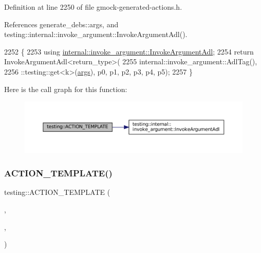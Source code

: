 Definition at line 2250 of file gmock-\/generated-\/actions.\+h.



References generate\+\_\+debs\+::args, and testing\+::internal\+::invoke\+\_\+argument\+::\+Invoke\+Argument\+Adl().


\begin{DoxyCode}
2252                                                             \{
2253   \textcolor{keyword}{using} \hyperlink{namespacetesting_1_1internal_1_1invoke__argument_abd36164191a3e386c50243074854b272}{internal::invoke\_argument::InvokeArgumentAdl};
2254   \textcolor{keywordflow}{return} InvokeArgumentAdl<return\_type>(
2255       internal::invoke\_argument::AdlTag(),
2256       ::testing::get<k>(\hyperlink{namespacegenerate__debs_a75f9143e38df82d83b2e8a6f99cae02c}{args}), p0, p1, p2, p3, p4, p5);
2257 \}
\end{DoxyCode}
Here is the call graph for this function\+:
\nopagebreak
\begin{figure}[H]
\begin{center}
\leavevmode
\includegraphics[width=350pt]{namespacetesting_ab85e5f54a209bf141fc04f8612fbe887_cgraph}
\end{center}
\end{figure}
\mbox{\label{namespacetesting_a8d3590561f334d165c620f522219831b}} 
\subsubsection{\texorpdfstring{A\+C\+T\+I\+O\+N\+\_\+\+T\+E\+M\+P\+L\+A\+T\+E()}{ACTION\_TEMPLATE()}\hspace{0.1cm}{\footnotesize\ttfamily [14/28]}}
{\footnotesize\ttfamily testing\+::\+A\+C\+T\+I\+O\+N\+\_\+\+T\+E\+M\+P\+L\+A\+TE (\begin{DoxyParamCaption}\item[{Invoke\+Argument}]{,  }\item[{H\+A\+S\+\_\+1\+\_\+\+T\+E\+M\+P\+L\+A\+T\+E\+\_\+\+P\+A\+R\+A\+MS(int, k)}]{,  }\item[{A\+N\+D\+\_\+7\+\_\+\+V\+A\+L\+U\+E\+\_\+\+P\+A\+R\+A\+MS(p0, p1, p2, p3, p4, p5, p6)}]{ }\end{DoxyParamCaption})}



